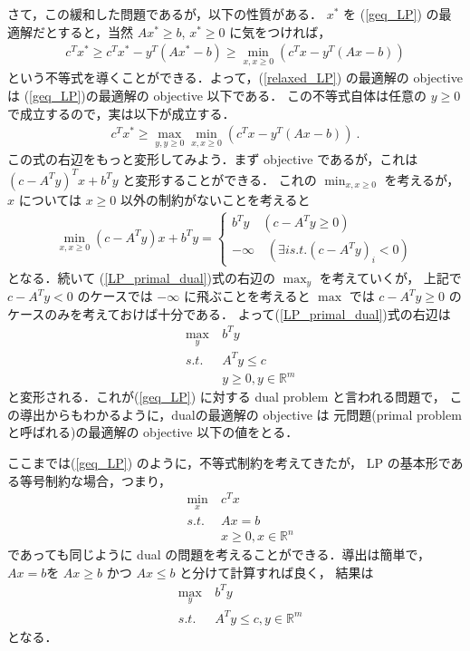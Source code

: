 \documentclass[11pt, a4]{article}
\begin{document}
さて，この緩和した問題であるが，以下の性質がある．
$x^*$ を (\ref{geq_LP}) の最適解だとすると，当然 $Ax^*\geq b$,
$x^* \geq 0$ に気をつければ，
\begin{eqnarray}
  c^Tx^{*} \geq c^Tx^{*} - y^T(Ax^{*} - b) \geq \min_{x, x\geq 0}(c^Tx - y^T(Ax - b))
\end{eqnarray}
という不等式を導くことができる．よって，(\ref{relaxed_LP}) の最適解の objective は
(\ref{geq_LP})の最適解の objective 以下である．
この不等式自体は任意の $y\geq 0$で成立するので，実は以下が成立する．
\begin{eqnarray}
  c^Tx^{*} \geq \max_{y, y\geq 0}\min_{x, x\geq 0}(c^Tx - y^T(Ax - b))\ .
  \label{LP_primal_dual}
\end{eqnarray}
この式の右辺をもっと変形してみよう．まず objective であるが，これは
$(c - A^Ty)^T x + b^Ty$ と変形することができる．
これの $\min_{x, x\geq 0}$ を考えるが，
$x$ については $x\geq 0$ 以外の制約がないことを考えると
\begin{eqnarray}
  \min_{x, x\geq0}(c - A^Ty) x + b^Ty =
  \left\{
  \begin{array}{l}
    b^Ty\quad(c - A^Ty \geq 0)\nonumber\\
    -\infty\quad (\exists i s.t. (c- A^Ty)_i  < 0)
  \end{array}
  \right.
\end{eqnarray}
となる．続いて (\ref{LP_primal_dual})式の右辺の $\max_{y}$ を考えていくが，
上記で $c - A^Ty < 0$ のケースでは $-\infty$ に飛ぶことを考えると
$\max$ では $c - A^Ty\geq 0$ のケースのみを考えておけば十分である．
よって(\ref{LP_primal_dual})式の右辺は
\begin{eqnarray}
  &\max_{y}&\ b^Ty\nonumber\\
  &s.t.&\ A^Ty \leq c\nonumber\\
  &\ &\ y\geq 0, y \in \mathbb{R}^m
  \label{geq_dual_LP}
\end{eqnarray}
と変形される．これが(\ref{geq_LP}) に対する dual problem と言われる問題で，
この導出からもわかるように，dualの最適解の objective は
元問題(primal problem と呼ばれる)の最適解の objective 以下の値をとる．

ここまでは(\ref{geq_LP}) のように，不等式制約を考えてきたが，
LP の基本形である等号制約な場合，つまり，
\begin{eqnarray}
  &\min_{x}&\ c^Tx\nonumber\\
  &s.t.&\ Ax = b \nonumber\\
  &\ &\ x\geq 0, x \in \mathbb{R}^n
  \label{general_LP}
\end{eqnarray}
であっても同じように dual の問題を考えることができる．導出は簡単で，
$Ax = b$を $Ax \geq b$ かつ $Ax \leq b$ と分けて計算すれば良く，
結果は
\begin{eqnarray}
  &\max_{y}&\ b^Ty\nonumber\\
  &s.t.&\ A^Ty \leq c, y \in \mathbb{R}^m
  \label{dual_LP}
\end{eqnarray}
となる．
\end{document}
